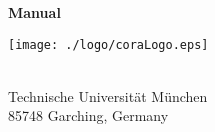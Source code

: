 
\thispagestyle{empty}

%
\pagecolor{covercolor}


\mbox{} \vspace{3cm} \mbox{}
\begin{center} {
        {\Huge\textbf{Manual}} \\
    [0.2cm] {\large \CORAVERSION}}
\end{center}
\vspace{2cm}
\begin{center}
    \texttt{[image: ./logo/coraLogo.eps]}
\end{center}
\vspace{3cm}
\begin{center}
\textbf{\large \CORAauthorsMultiLine}
    \\
    [0.2cm] Technische Universit\"at M\"unchen \\
    85748 Garching, Germany
\end{center}
